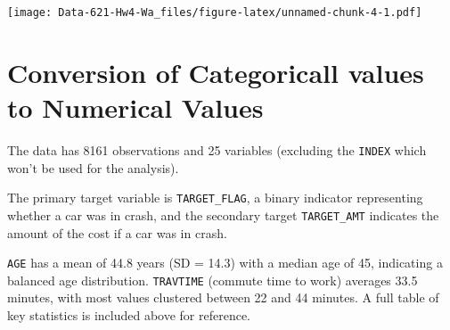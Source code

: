 \documentclass[
]{article}
\newenvironment{Shaded}{\begin{snugshade}}{\end{snugshade}}
\newcommand{\AttributeTok}[1]{\textcolor[rgb]{0.13,0.29,0.53}{#1}}
\newcommand{\CommentTok}[1]{\textcolor[rgb]{0.56,0.35,0.01}{\textit{#1}}}
\newcommand{\ConstantTok}[1]{\textcolor[rgb]{0.56,0.35,0.01}{#1}}
\newcommand{\DecValTok}[1]{\textcolor[rgb]{0.00,0.00,0.81}{#1}}
\newcommand{\FunctionTok}[1]{\textcolor[rgb]{0.13,0.29,0.53}{\textbf{#1}}}
\newcommand{\NormalTok}[1]{#1}
\newcommand{\OtherTok}[1]{\textcolor[rgb]{0.56,0.35,0.01}{#1}}
\newcommand{\SpecialCharTok}[1]{\textcolor[rgb]{0.81,0.36,0.00}{\textbf{#1}}}
\newcommand{\StringTok}[1]{\textcolor[rgb]{0.31,0.60,0.02}{#1}}
\begin{document}
\begin{Shaded}
\end{Shaded}

\texttt{[image: Data-621-Hw4-Wa\_files/figure-latex/unnamed-chunk-4-1.pdf]}

\section{Conversion of Categoricall values to Numerical
Values}\label{conversion-of-categoricall-values-to-numerical-values}

The data has 8161 observations and 25 variables (excluding the
\texttt{INDEX} which won't be used for the analysis).

The primary target variable is \texttt{TARGET\_FLAG}, a binary indicator
representing whether a car was in crash, and the secondary target
\texttt{TARGET\_AMT} indicates the amount of the cost if a car was in
crash.

\texttt{AGE} has a mean of 44.8 years (SD = 14.3) with a median age of
45, indicating a balanced age distribution. \texttt{TRAVTIME} (commute
time to work) averages 33.5 minutes, with most values clustered between
22 and 44 minutes. A full table of key statistics is included above for
reference.
\end{document}
